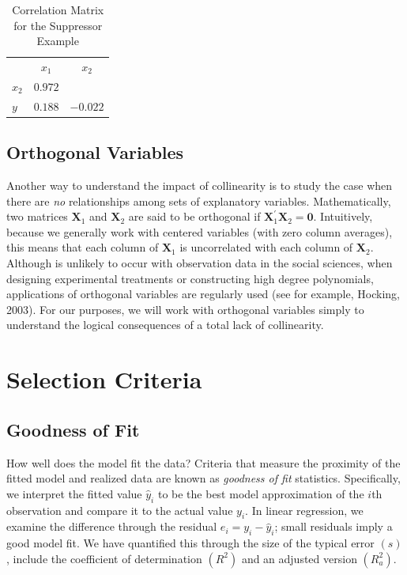 \begin{table}[h]

\caption{\label{T5:Suppress} Correlation Matrix for the Suppressor
Example}

\begin{tabular}{ccc}
\hline
& $x_1$ & $x_2$ \\
\multicolumn{1}{l}{$x_2$} & $0.972$ &  \\
\multicolumn{1}{l}{$y$} & $0.188$ & $-0.022$ \\ \hline
\end{tabular}
\linetjed {}
\end{table}


\subsection{Orthogonal Variables}\label{S5:Orthogonal}
Another way to understand the impact of collinearity is to study the
case when there are \emph{no} relationships among sets of
explanatory variables. Mathematically, two matrices $\mathbf{X}_1$
and $\mathbf{X}_2$ are said to be orthogonal if
$\mathbf{X}_1^{\prime}\mathbf{X}_2= \mathbf{0}.$ Intuitively,
because we generally work with centered variables (with zero column
averages), this means that each column of $\mathbf{X}_1$ is
uncorrelated with each column of $\mathbf{X}_2$. Although is
unlikely to occur with observation data in the social sciences, when
designing experimental treatments or constructing high degree
polynomials, applications of orthogonal variables are regularly used
(see for example, Hocking, 2003). For our purposes, we will work
with orthogonal variables simply to understand the logical
consequences of a total lack of collinearity.






\section{Selection Criteria}


\subsection{Goodness of Fit}

How well does the model fit the data? Criteria that measure the
proximity of the fitted model and realized data are known as
\emph{goodness of fit} statistics. Specifically, we interpret the
fitted value $\hat{y}_i$ to be the best model approximation of the
$i$th observation and compare it to the actual value $y_i$. In
linear regression, we examine the difference through the residual
$e_i= y_i - \hat{y}_i$; small residuals imply a good model fit. We
have quantified this through the size of the typical error $(s)$,
include the coefficient of determination $(R^2)$ and an adjusted
version $(R_{a}^2)$.

